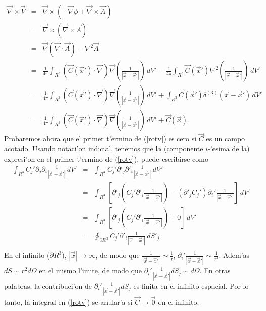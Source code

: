 \begin{eqnarray}
\vec\nabla\times\vec
V&=&\vec\nabla\times\left(-\vec\nabla\phi+\vec\nabla\times\vec
A\right) \\
&=& \vec\nabla\times(\vec\nabla\times\vec A) \\
&=& \vec\nabla(\vec\nabla\cdot\vec A) -\nabla^2\vec A\\
&=& \frac{1}{4\pi}\int_{R^3}(\vec
C(\vec x')\cdot\vec\nabla)\vec\nabla\left(\frac{1}{\left|\vec
x-\vec x'\right|}\right)\,dV' -\frac{1}{4\pi}\int_{R^3}\vec
C(\vec x')\nabla^2\left(\frac{1}{\left|\vec
x-\vec x'\right|}\right)\,dV' \\
&=& \frac{1}{4\pi}\int_{R^3}(\vec
C(\vec x')\cdot\vec\nabla)\vec\nabla\left(\frac{1}{\left|\vec
x-\vec x'\right|}\right)\,dV' +\int_{R^3}\vec
C(\vec x')\delta^{(3)}\left(\vec x-\vec x'\right)\,dV' \\
&=& \frac{1}{4\pi}\int_{R^3}(\vec
C(\vec x')\cdot\vec\nabla)\vec\nabla\left(\frac{1}{\left|\vec
x-\vec x'\right|}\right)\,dV' +\vec C(\vec x). \label{rotv}
\end{eqnarray}
Probaremos ahora que el primer t'ermino de (\ref{rotv}) es cero si $\vec C$ es
un campo acotado. Usando notaci'on indicial, tenemos que la (componente
$i$-'esima de la) expresi'on en el primer t'ermino de (\ref{rotv}), puede
escribirse como
\begin{eqnarray}
\int_{R^3}C_j'\partial_j\partial_i\frac{1}{\left|\vec
x-\vec x'\right|}\,dV'
&=&\int_{R^3}C_j'\partial'_j\partial'_i\frac{1}{
\left|\vec x-\vec x'\right|}\,dV'\\
&=&\int_{R^3}\left[\partial'_j\left(C_j'\partial'_i\frac{1}{
\left|\vec x-\vec x'\right|}\right)-(\partial'_jC_j')\partial_i'\frac{1}{
\left|\vec x-\vec x'\right|}\right]\,dV'\\
&=&\int_{R^3}\left[\partial'_j\left(C_j'\partial'_i\frac{1}{
\left|\vec x-\vec x'\right|}\right)+0\right]\,dV'\\
&=&\oint_{\partial R^3}C_j'\partial'_i\frac{1}{\left|\vec x-\vec
x'\right|}\,dS'_j\\
\end{eqnarray}
En el infinito ($\partial R^3$), $|\vec x|\rightarrow \infty$, de modo que
$\frac{1}{\left|\vec x-\vec x'\right|}\sim \frac{1}{r}$,
$\partial_i'\frac{1}{\left|\vec x-\vec x'\right|}\sim \frac{1}{r^2}$. Adem'as
$dS\sim r^2d\Omega$ en el mismo l'imite, de modo que
$\partial_i'\frac{1}{\left|\vec x-\vec x'\right|}dS_j\sim d\Omega$. En otras
palabras, la contribuci'on de $\partial_i'\frac{1}{\left|\vec x-\vec
x'\right|}dS_j$ es finita en el infinito espacial. Por lo tanto, la integral
en (\ref{rotv}) se anular'a si $\vec C\rightarrow\vec 0$ en el infinito.

